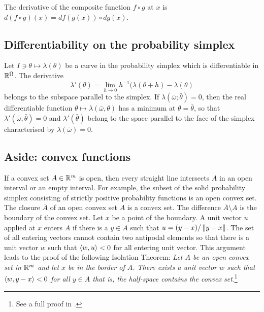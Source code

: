 \documentclass[12pt,a4paper]{amsart}
\theoremstyle{plain}%
\theoremstyle{definition}
\theoremstyle{remark}
\begin{document}
The derivative of the composite function $f \circ g$ at $x$ is $d(f\circ g)(x) = df(g(x)) \circ dg(x)$.

\subsection{Differentiability on the probability simplex} Let $I \ni \theta \mapsto \lambda(\theta)$ be a curve in the probability simplex  which is differentiable in $\mathbb{R}^\Omega$. The derivative
\begin{equation*}
\lambda'(\theta) = \lim_{h \to 0} h^{-1} (\lambda(\theta+h) - \lambda(\theta)
\end{equation*}
belongs to the subspace parallel to the simplex. If $\lambda(\bar \omega;\bar \theta) = 0$, then the real differentiable function $\theta \mapsto \lambda(\bar\omega,\theta)$ has a minimum at $\theta=\bar\theta$, so that $\lambda'(\bar\omega,\bar\theta)=0$ and $\lambda'(\bar\theta)$ belong to the space parallel to the face of the simplex characterised by $\lambda(\bar\omega) = 0$.

\subsection{Aside: convex functions}

If a convex set $A \in \mathbb{R}^m$ is open, then every straight line intersects $A$ in an open interval or an empty interval. For example, the subset of the solid probability simplex consisting of strictly positive probability functions is an open convex set. The closure $\overline A$ of an open convex set $A$ is a convex set. The difference $\overline A \setminus A$ is the boundary of the convex set. Let $x$ be a point of the boundary. A unit vector $u$ applied at $x$ enters $A$ if there is a $y \in A$ such that $u = (y-x)/\left\Vert y-x\right\Vert$. The set of all entering vectors cannot contain two antipodal elements so that there is a unit vector $w$ such that $\left\langle w,u\right\rangle < 0$ for all entering unit vector. This argument leads to the proof of the following Isolation Theorem: \emph{Let $A$ be an open convex set in $\mathbb{R}^m$ and let $x$ be in the border of $A$. There exists a unit vector $w$ such that  $\left\langle w,y-x\right\rangle < 0$ for all $y \in A$ that is, the half-space contains the convex set}.\footnote{See a full proof in \cite[p 45-46]{barvinok:2002}.}
\end{document}
